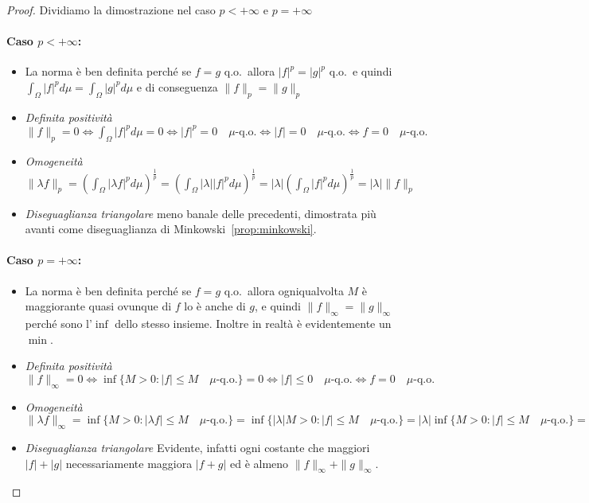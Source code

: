 \begin{proof}
    Dividiamo la dimostrazione nel caso \(p < +\infty\) e \(p = +\infty\) 

    \paragraph{Caso \(p < +\infty\):}
\begin{itemize}[label = --]
    \item La norma è ben definita perché se \(f = g\) q.o.~allora \(|f|^{p} =
        |g|^{p}\) q.o.~e quindi \(\int_{\Omega} |f|^{p} d\mu = \int_{\Omega}
        |g|^{p} d\mu\) e di conseguenza \(\|f\|_p = \|g\|_p\) 
    \item \emph{Definita positività} \(\|f\|_p = 0 \iff \int_{\Omega} |f|^{p}
        d\mu = 0 \iff |f|^{p} = 0 \quad \mu\text{-q.o.} \iff |f| = 0 \quad
        \mu\text{-q.o.} \iff f = 0 \quad \mu\text{-q.o.}\)
    \item \emph{Omogeneità} \(\|\lambda f\|_p = {\left( \int_{\Omega} |\lambda
        f|^{p} d\mu \right)}^{\frac{1}{p}} = {\left( \int_{\Omega} |\lambda |
        |f|^{p} d\mu \right)}^{\frac{1}{p}} = |\lambda| {\left( \int_{\Omega}
        |f|^{p} d\mu \right)}^{\frac{1}{p}} = |\lambda| \|f\|_p\)
    \item \emph{Diseguaglianza triangolare} meno banale delle precedenti,
        dimostrata più avanti come diseguaglianza di
        Minkowski~\ref{prop:minkowski}.
\end{itemize}
\paragraph{Caso \(p = +\infty\):}
\begin{itemize}[label = --]
    \item La norma è ben definita perché se \(f = g\) q.o.~allora ogniqualvolta
        \(M\) è maggiorante quasi ovunque di \(f\) lo è anche di \(g\), e quindi
        \(\|f\|_{\infty} = \|g\|_{\infty}\) perché sono l'\(\inf\)  dello stesso
        insieme. Inoltre in realtà è evidentemente un \(\min\).
    \item \emph{Definita positività} \(\|f\|_{\infty} = 0 \iff \inf \{M > 0 : |f|
        \le M \quad \mu\text{-q.o.} \} = 0 \iff |f| \le 0 \quad \mu\text{-q.o.}
        \iff f = 0 \quad \mu\text{-q.o.}\)
    \item \emph{Omogeneità} \(\|\lambda f\|_{\infty} = \inf \{M > 0 : |\lambda f| \le M
        \quad \mu\text{-q.o.} \} = \inf \{|\lambda| M > 0 : |f| \le M \quad
        \mu\text{-q.o.} \} = |\lambda| \inf \{M > 0 : |f| \le M \quad
        \mu\text{-q.o.} \} = |\lambda| \|f\|_{\infty}\)
    \item \emph{Diseguaglianza triangolare} Evidente, infatti ogni costante che
        maggiori \(|f| + |g|\) necessariamente maggiora \(|f + g|\) ed è almeno
        \(\|f\|_\infty + \|g\|_\infty\).
\end{itemize}
\end{proof}

